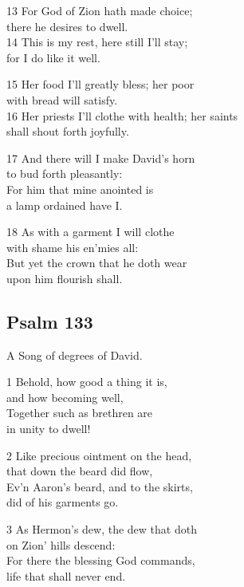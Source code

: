13 For God of Zion hath made choice;\\
there he desires to dwell.\\
14 This is my rest, here still I’ll stay;\\
for I do like it well.

15 Her food I’ll greatly bless; her poor\\
with bread will satisfy.\\
16 Her priests I’ll clothe with health; her saints\\
shall shout forth joyfully.

17 And there will I make David’s horn\\
to bud forth pleasantly:\\
For him that mine anointed is\\
a lamp ordained have I.

18 As with a garment I will clothe\\
with shame his en’mies all:\\
But yet the crown that he doth wear\\
upon him flourish shall.

\begin{center}
\quad{}\quad{}
\end{center}

\subsection*{Psalm 133}

A Song of degrees of David.

1 Behold, how good a thing it is,\\
and how becoming well,\\
Together such as brethren are\\
in unity to dwell!

2 Like precious ointment on the head,\\
that down the beard did flow,\\
Ev’n Aaron’s beard, and to the skirts,\\
did of his garments go.

3 As Hermon’s dew, the dew that doth\\
on Zion’ hills descend:\\
For there the blessing God commands,\\
life that shall never end.

\begin{center}
\quad{}\quad{}
\end{center}

